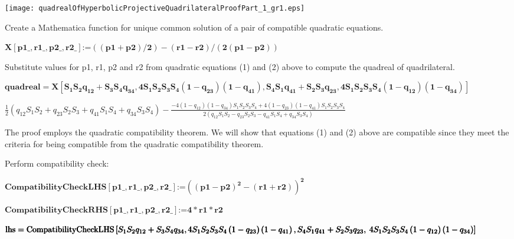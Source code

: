 \documentclass{article}
\begin{document}
\texttt{[image: quadrealOfHyperbolicProjectiveQuadrilateralProofPart\_1\_gr1.eps]}

Create a Mathematica function for unique common solution of a pair of compatible quadratic equations.

\begin{doublespace}
\noindent\(\pmb{X[\text{p1$\_$},\text{r1$\_$},\text{p2$\_$},\text{r2$\_$}]\text{:=}((\text{p1}+\text{p2})/2)-(\text{r1}-\text{r2})/(2(\text{p1}-\text{p2}))}\)
\end{doublespace}

Substitute values for p1, r1, p2 and r2 from quadratic equations (1) and (2) above to compute the quadreal of quadrilateral.

\begin{doublespace}
\noindent\(\pmb{\text{quadreal}=X\left[S_1S_2q_{12}+S_3S_4q_{34},4S_1S_2S_3S_4\left(1-q_{23}\right)\left(1-q_{41}\right),S_4S_1q_{41}+S_2S_3q_{23},4S_1S_2S_3S_4\left(1-q_{12}\right)\left(1-q_{34}\right)\right]}\)
\end{doublespace}

\begin{doublespace}
\noindent\(\frac{1}{2} \left(q_{12} S_1 S_2+q_{23} S_2 S_3+q_{41} S_1 S_4+q_{34} S_3 S_4\right)-\frac{-4 \left(1-q_{12}\right) \left(1-q_{34}\right)
S_1 S_2 S_3 S_4+4 \left(1-q_{23}\right) \left(1-q_{41}\right) S_1 S_2 S_3 S_4}{2 \left(q_{12} S_1 S_2-q_{23} S_2 S_3-q_{41} S_1 S_4+q_{34} S_3 S_4\right)}\)
\end{doublespace}



The proof employs the quadratic compatibility theorem. We will show that equations (1) and (2) above are compatible since they meet the criteria
for being compatible from the quadratic compatibility theorem. 

Perform compatibility check:

\begin{doublespace}
\noindent\(\pmb{\text{CompatibilityCheckLHS} [\text{p1$\_$},\text{r1$\_$},\text{p2$\_$},\text{r2$\_$}]\text{:=}\left((\text{p1}-\text{p2})^2-(\text{r1}+\text{r2})\right)^2}\)
\end{doublespace}

\begin{doublespace}
\noindent\(\pmb{\text{CompatibilityCheckRHS} [\text{p1$\_$},\text{r1$\_$},\text{p2$\_$},\text{r2$\_$}]\text{:=} 4*\text{r1}*\text{r2}}\)
\end{doublespace}

\begin{doublespace}
\noindent\(\pmb{\text{lhs} = \text{CompatibilityCheckLHS}\left[S_1S_2q_{12}+S_3S_4q_{34},4S_1S_2S_3S_4\left(1-q_{23}\right)\left(1-q_{41}\right),S_4S_1q_{41}+S_2S_3q_{23},\right.}\\
\pmb{\left.4S_1S_2S_3S_4\left(1-q_{12}\right)\left(1-q_{34}\right)\right]}\)
\end{doublespace}
\end{document}
